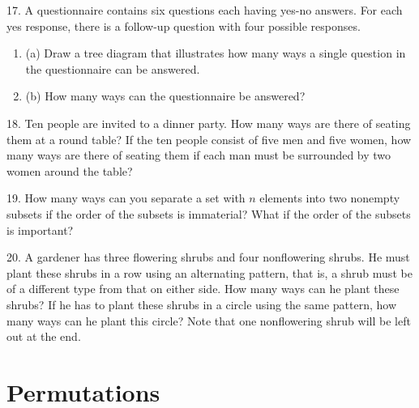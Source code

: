 \documentclass[10pt,]{book}
\theoremstyle{plain}
\theoremstyle{definition}
\begin{document}
\hypertarget{exercisegroup-11}{}\begin{exercisegroup}
\item[17.]\hypertarget{exercise-58}{} A questionnaire contains six questions each having yes-no answers. For each yes response, there is a follow-up question with four possible responses.
\leavevmode%
\begin{enumerate}[label=(\alph*)]
\item\hypertarget{li-202}{}
   (a) Draw a tree diagram that illustrates how many ways a single question in the questionnaire can be answered.
\item\hypertarget{li-203}{}
    (b) How many ways can the questionnaire be answered?
\end{enumerate}
\par\smallskip
\item[18.]\hypertarget{exercise-59}{} Ten people are invited to a dinner party. How many ways are there of seating them at a round table? If the ten people consist of five men and five women, how many ways are there of seating them if each man must be surrounded by two women around the table?\par\smallskip
\item[19.]\hypertarget{exercise-60}{} How many ways can you separate a set with \(n\)  elements into two nonempty subsets if the order of the subsets is immaterial? What if the order of the subsets is important?\par\smallskip
\item[20.]\hypertarget{exercise-61}{} A gardener has three flowering shrubs and four nonflowering shrubs. He must plant these shrubs in a row using an alternating pattern, that is, a shrub must be of a different type from that on either side. How many ways can he plant these shrubs? If he has to plant these shrubs in a circle using the same pattern, how many ways can he plant this circle? Note that one nonflowering shrub will be left out at the end.\par\smallskip
\end{exercisegroup}
\par\smallskip\noindent
\typeout{************************************************}
\typeout{************************************************}
\section[Permutations]{Permutations}\label{permutations}
\end{document}
